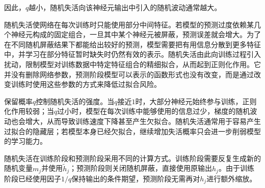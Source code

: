 因此，$q$越小，随机失活向该神经元输出中引入的随机波动通常越大。\par
随机失活使网络在每次训练时只能使用部分中间特征。若模型的预测过度依赖某几个神经元构成的固定组合，一旦其中某个神经元被屏蔽，预测误差就会增大。为了在不同随机屏蔽结果下都能给出较好的预测，模型需要把有用信息分散到更多特征中，并学习在部分特征暂时缺失时仍然有效的表示。随机失活由此向训练过程引入扰动，限制模型对训练数据中特定特征组合的精细拟合，从而起到正则化作用。它并没有删除网络参数，预测阶段模型可以表示的函数形式也没有改变，而是通过改变训练时使用这些参数的方式来降低过拟合风险。\par
保留概率$q$控制随机失活的强度。当$q$接近$1$时，大部分神经元始终参与训练，正则化作用较弱；当$q$过小时，模型在每次训练中能够使用的信息过少，梯度的随机波动也会增大，从而导致训练速度下降甚至产生欠拟合。随机失活通常用于容易产生过拟合的隐藏层；若模型本身已经欠拟合，继续增加失活概率只会进一步削弱模型的学习能力。
\begin{note}
	随机失活在训练阶段和预测阶段采用不同的计算方式。训练阶段需要反复生成新的随机变量$m_j$并使用$\tilde{h}_j$；预测阶段则关闭随机屏蔽，直接使用原输出$h_j$。由于训练阶段已经使用因子$1/q$保持输出的条件期望，预测阶段无需再对$h_j$进行额外缩放。
\end{note}

